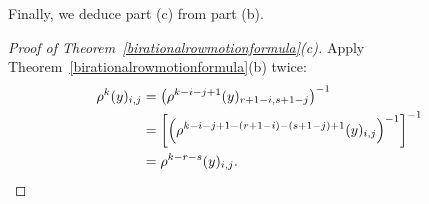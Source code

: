 \documentclass[11pt]{article}
\theoremstyle{definition}
\numberwithin{equation}{section}
\numberwithin{equation}{section}
\begin{document}









%
%

Finally, we deduce part (c) from part (b).
%

\begin{proof} [Proof of Theorem~\ref{birationalrowmotionformula}(c)]
Apply Theorem~\ref{birationalrowmotionformula}(b) twice:
\begin{align*}
    \rho^{k}(y)_{i,j} &= \left(\rho^{k-i-j+1}(y)_{r+1-i,s+1-j}\right)^{-1}\\ 
    &= \left[\left(\rho^{k-i-j+1-(r+1-i)-(s+1-j)+1}(y)_{i,j}\right)^{-1}\right]^{-1}\\
    & = \rho^{k-r-s}(y)_{i,j}.\qedhere
\end{align*}
\end{proof}
\end{document}
